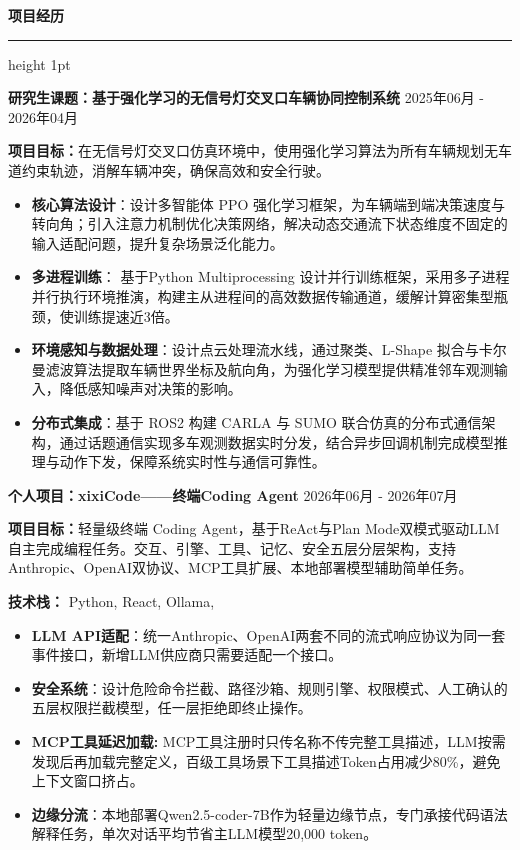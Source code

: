 \documentclass[10pt, a4paper]{ctexart}
\newcommand{\cvsection}[1]{
    \vspace{2ex}
    {\large\bfseries #1}
    \vspace{0.5ex}
    \hrule height 1pt
    \vspace{1.5ex}
}
\newcommand{\cvitemheader}[2]{
    {\bfseries #1} \hfill #2 \par
    \vspace{0.5ex}
}
\begin{document}
\cvsection{\textcolor[HTML]{365F91}{项目经历 }}
\cvitemheader{研究生课题：基于强化学习的无信号灯交叉口车辆协同控制系统}{2025年06月 - 2026年04月}
\textbf{项目目标：}在无信号灯交叉口仿真环境中，使用强化学习算法为所有车辆规划无车道约束轨迹，消解车辆冲突，确保高效和安全行驶。
\begin{itemize}[leftmargin=1.5em, itemsep=0pt, parsep=0pt, topsep=0.5ex]
    \item \textbf{核心算法设计}：设计多智能体 PPO 强化学习框架，为车辆端到端决策速度与转向角；引入注意力机制优化决策网络，解决动态交通流下状态维度不固定的输入适配问题，提升复杂场景泛化能力。
    \item \textbf{多进程训练}： 基于Python Multiprocessing 设计并行训练框架，采用多子进程并行执行环境推演，构建主从进程间的高效数据传输通道，缓解计算密集型瓶颈，使训练提速近3倍。
    \item \textbf{环境感知与数据处理}：设计点云处理流水线，通过聚类、L-Shape 拟合与卡尔曼滤波算法提取车辆世界坐标及航向角，为强化学习模型提供精准邻车观测输入，降低感知噪声对决策的影响。
     \item \textbf{分布式集成}：基于 ROS2 构建 CARLA 与 SUMO 联合仿真的分布式通信架构，通过话题通信实现多车观测数据实时分发，结合异步回调机制完成模型推理与动作下发，保障系统实时性与通信可靠性。
\end{itemize}

\vspace{6pt}


\vspace{5pt}



\cvitemheader{个人项目：xixiCode——终端Coding Agent}{2026年06月 - 2026年07月}
\textbf{项目目标：}轻量级终端 Coding Agent，基于ReAct与Plan Mode双模式驱动LLM自主完成编程任务。交互、引擎、工具、记忆、安全五层分层架构，支持Anthropic、OpenAI双协议、MCP工具扩展、本地部署模型辅助简单任务。

\textbf{技术栈：} Python, React, Ollama,  
\begin{itemize}[leftmargin=1.5em, itemsep=0pt, parsep=0pt, topsep=0.5ex]
    \item \textbf{LLM API适配}：统一Anthropic、OpenAI两套不同的流式响应协议为同一套事件接口，新增LLM供应商只需要适配一个接口。
    \item \textbf{安全系统}：设计危险命令拦截、路径沙箱、规则引擎、权限模式、人工确认的五层权限拦截模型，任一层拒绝即终止操作。
    \item \textbf{MCP工具延迟加载:} MCP工具注册时只传名称不传完整工具描述，LLM按需发现后再加载完整定义，百级工具场景下工具描述Token占用减少80\%，避免上下文窗口挤占。
    \item \textbf{边缘分流}：本地部署Qwen2.5-coder-7B作为轻量边缘节点，专门承接代码语法解释任务，单次对话平均节省主LLM模型20,000 token。
     
\end{itemize}
\end{document}
